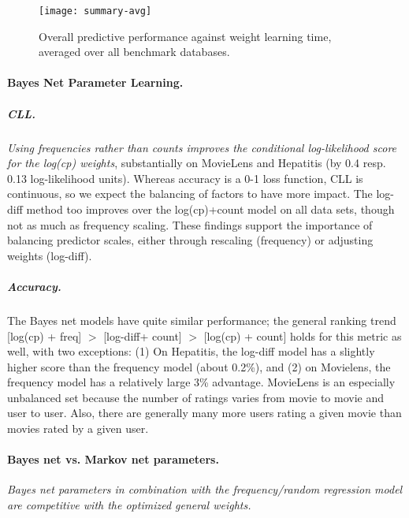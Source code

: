 \documentclass[twoside,leqno,twocolumn]{article}
\begin{document}
\begin{figure}[t]
\begin{center}
\texttt{[image: summary-avg]}
\caption{Overall predictive performance against weight learning time, averaged over all benchmark databases. 
\label{fig:summarize}}
\end{center}
\end{figure}

\paragraph{Bayes Net Parameter Learning.}
\subparagraph{CLL.} {\em Using frequencies rather than counts improves the conditional log-likelihood score for the log(cp) weights}, substantially on MovieLens and Hepatitis (by 0.4 resp. 0.13 log-likelihood units). Whereas accuracy is a 0-1 loss function, CLL is continuous, so we expect the balancing of factors to have more impact. The log-diff method too improves over the log(cp)+count model on all data sets, though not as much as frequency scaling. These findings support the importance of balancing predictor scales, either through rescaling (frequency) or adjusting weights (log-diff). 

\subparagraph{Accuracy.}  The Bayes net models have quite similar performance; the general ranking trend  [log(cp) + freq] $>$ [log-diff+ count] $>$ [log(cp) + count] holds for this metric as well, with two exceptions: (1) On Hepatitis, the log-diff model has a slightly higher score than the frequency model (about 0.2\%), and (2) on Movielens, the frequency model has a relatively large 3\% advantage. MovieLens is an especially unbalanced set because the number of ratings varies from movie to movie and user to user.  %
Also, there are generally many more users rating a given movie than movies rated by a given user. 

\paragraph{Bayes net vs. Markov net parameters.} 
{\em Bayes net parameters in combination with the frequency/random regression model are competitive with the optimized general weights.} 
 
\end{document}
